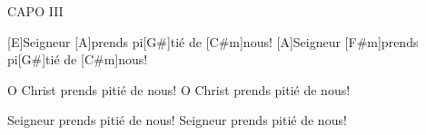 \IncludeLilypond

\annot{}
CAPO III

[E]Seigneur [A]prends pi[G#]tié de [C#m]nous!
[A]Seigneur [F#m]prends pi[G#]tié de [C#m]nous!

O Christ prends pitié de nous!
O Christ prends pitié de nous!

Seigneur prends pitié de nous!
Seigneur prends pitié de nous!
